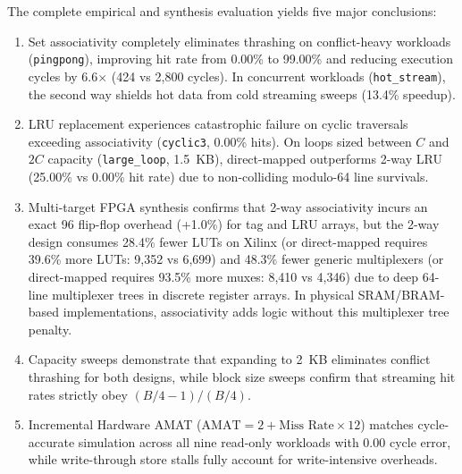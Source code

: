 \documentclass[journal,10pt,twocolumn]{IEEEtran}
\begin{document}
The complete empirical and synthesis evaluation yields five major conclusions:
\begin{enumerate}
    \item Set associativity completely eliminates thrashing on conflict-heavy workloads (\texttt{pingpong}), improving hit rate from 0.00\% to 99.00\% and reducing execution cycles by 6.6$\times$ (424 vs 2,800 cycles). In concurrent workloads (\texttt{hot\_stream}), the second way shields hot data from cold streaming sweeps (13.4\% speedup).
    \item LRU replacement experiences catastrophic failure on cyclic traversals exceeding associativity (\texttt{cyclic3}, 0.00\% hits). On loops sized between $C$ and $2C$ capacity (\texttt{large\_loop}, 1.5~KB), direct-mapped outperforms 2-way LRU (25.00\% vs 0.00\% hit rate) due to non-colliding modulo-64 line survivals.
    \item Multi-target FPGA synthesis confirms that 2-way associativity incurs an exact 96 flip-flop overhead (+1.0\%) for tag and LRU arrays, but the 2-way design consumes 28.4\% fewer LUTs on Xilinx (or direct-mapped requires 39.6\% more LUTs: 9,352 vs 6,699) and 48.3\% fewer generic multiplexers (or direct-mapped requires 93.5\% more muxes: 8,410 vs 4,346) due to deep 64-line multiplexer trees in discrete register arrays. In physical SRAM/BRAM-based implementations, associativity adds logic without this multiplexer tree penalty.
    \item Capacity sweeps demonstrate that expanding to 2~KB eliminates conflict thrashing for both designs, while block size sweeps confirm that streaming hit rates strictly obey $(B/4 - 1)/(B/4)$.
    \item Incremental Hardware AMAT ($\text{AMAT} = 2 + \text{Miss Rate} \times 12$) matches cycle-accurate simulation across all nine read-only workloads with 0.00 cycle error, while write-through store stalls fully account for write-intensive overheads.
\end{enumerate}



\end{document}
